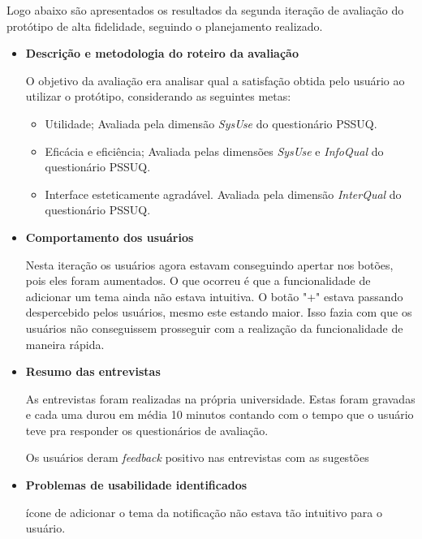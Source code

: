   Logo abaixo são apresentados os resultados da segunda iteração de avaliação do protótipo de alta fidelidade,
  seguindo o planejamento realizado.
  
  \begin{itemize}
    \item \textbf{Descrição e metodologia do roteiro da avaliação}
    
    \subitem O objetivo da avaliação era analisar qual a satisfação obtida pelo usuário ao utilizar o protótipo, 
    considerando as seguintes metas:
    
    \begin{itemize}
      \item Utilidade;
	\subitem Avaliada pela dimensão \textit{SysUse} do questionário PSSUQ.
	
      \item Eficácia e eficiência;
	\subitem Avaliada pelas dimensões \textit{SysUse} e \textit{InfoQual} do questionário PSSUQ.
	
      \item Interface esteticamente agradável.
	\subitem Avaliada pela dimensão \textit{InterQual} do questionário PSSUQ.
    \end{itemize}
    
    \item \textbf{Comportamento dos usuários}
    
    \subitem Nesta iteração os usuários  agora estavam conseguindo apertar nos botões, pois eles foram aumentados. O que ocorreu é 
    que a funcionalidade de adicionar um tema ainda não estava intuitiva. O botão "+" estava passando despercebido pelos 
    usuários, mesmo este estando maior. Isso fazia com que os usuários não conseguissem prosseguir com a realização da
    funcionalidade de maneira rápida.
    
    
    \item \textbf{Resumo das entrevistas}
    
      \subitem As entrevistas foram realizadas na própria universidade. Estas foram gravadas e cada uma durou em 
	  média 10 minutos contando com o tempo que o usuário teve pra responder os questionários de avaliação.
	  
	  Os usuários deram \textit{feedback} positivo nas entrevistas com as sugestões 
	    
    \item \textbf{Problemas de usabilidade identificados}
    
      \subitem ícone de adicionar o tema da notificação não estava tão intuitivo para o usuário.
          

\end{itemize}
